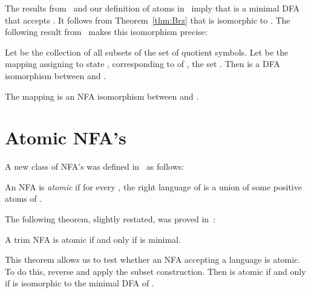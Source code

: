 \documentclass{llncs}
\begin{document}
The results from~\cite{BrTa11} and  our definition of 
atoms in~\cite{BrTa12} imply that  is a minimal DFA 
that accepts . It follows from Theorem~\ref{thm:Brz} that  
 is isomorphic to .
The following result from~\cite{BrTa12} makes this isomorphism precise:

\begin{theorem}[Isomorphism]
\label{thm:isomorphism}
Let  be the collection of all subsets of the set  of quotient symbols.
Let  be the mapping assigning to state 
, corresponding to
 of , the set 
.
Then  is a DFA isomorphism between  and 
. 
\end{theorem}

\begin{corollary}
\label{cor:isomorphism}
The mapping  is an NFA isomorphism between 
 and .
\end{corollary}



\section{Atomic NFA's}
\label{sec:atomic}


A new class of NFA's was defined in~\cite{BrTa11} as follows:   

\begin{definition}
\label{def:atomic}
An NFA  is \emph{atomic} if for every  
, the right language  of  is a union of some positive  atoms of . 
\end{definition}

The following theorem, slightly restated, was proved in~\cite{BrTa11}:
\newpage

\begin{theorem}[Atomicity]
\label{thm:atomic}
A trim NFA  is atomic if and only if 
is minimal.
\end{theorem}

This theorem allows us to test whether an NFA  accepting a language  is atomic. To do this, reverse  and apply the subset construction. Then  is atomic if and only if 
is isomorphic to the minimal DFA of .
\end{document}
